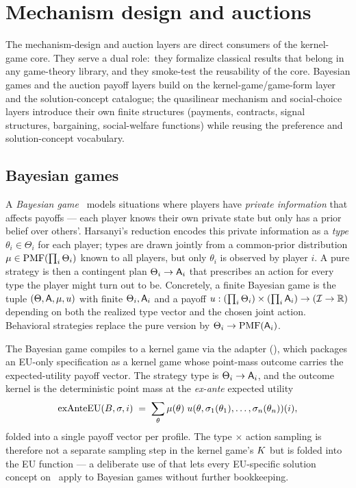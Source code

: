\section{Mechanism design and auctions}
\label{sec:mechanism-auctions}

The mechanism-design and auction layers are direct consumers of
the kernel-game core.  They serve a dual role:\ they formalize
classical results that belong in any game-theory library, and
they smoke-test the reusability of the core.  Bayesian games and the
auction payoff layers build on the kernel-game/game-form layer and the
solution-concept catalogue; the quasilinear mechanism and
social-choice layers introduce their own finite structures (payments,
contracts, signal structures, bargaining, social-welfare functions)
while reusing the preference and solution-concept vocabulary.

\subsection{Bayesian games}
\label{sec:mech:bayesian}

A \emph{Bayesian game}~\citep{Harsanyi1967} models situations
where players have \emph{private information} that affects payoffs
— each player knows their own private state but only has a prior
belief over others'.  Harsanyi's reduction encodes this private
information as a \emph{type} $\theta_i \in \Theta_i$ for each
player; types are drawn jointly from a common-prior distribution
$\mu \in \mathrm{PMF}(\prod_i \Theta_i)$ known to all players, but only
$\theta_i$ is observed by player $i$.  A pure strategy is then a
contingent plan $\Theta_i \to \mathsf{A}_i$ that prescribes an action
for every type the player might turn out to be.  Concretely, a
finite Bayesian game is the tuple
$(\Theta, \mathsf{A}, \mu, u)$ with finite $\Theta_i, \mathsf{A}_i$ and a
payoff $u : (\prod_i \Theta_i) \times (\prod_i \mathsf{A}_i) \to
(\mathcal{I} \to \mathbb{R})$ depending on both the realized type vector and
the chosen joint action.  Behavioral strategies replace the pure
version by
$\Theta_i \to \mathrm{PMF}(\mathsf{A}_i)$.

The Bayesian game compiles to a kernel game via the 
adapter (), which packages an
EU-only specification as a kernel game whose point-mass outcome
carries the expected-utility payoff vector.  The strategy type is
$\Theta_i \to \mathsf{A}_i$, and the outcome kernel is the deterministic
point mass at the \emph{ex-ante} expected utility
\[
  \mathrm{exAnteEU}(B, \sigma, i)
    \;=\; \sum_{\theta} \mu(\theta)\;
        u(\theta, \sigma_1(\theta_1), \dots, \sigma_n(\theta_n))(i),
\]
folded into a single payoff vector per profile.  The
type$\,\times\,$action sampling is therefore not a separate
sampling step in the kernel game's $K$ but is folded into the EU
function — a deliberate use of  that lets every
EU-specific solution concept on \KG\ apply to Bayesian games
without further bookkeeping.

